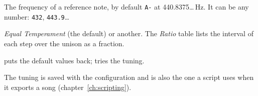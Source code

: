 
\begin{description}[style=nextline,leftmargin=1.2cm]
  \item[Base tuning (Hz) and Base note] The frequency of a reference note, by default \texttt{A-} at 440.8375\ldots\,Hz. It can be any
        number: \texttt{432}, \texttt{443.9}\ldots
  \item[Temperament] \emph{Equal Temperament} (the default) or another. The \emph{Ratio} table lists the interval of each step over the unison
        as a fraction.
  \item[Reset] puts the default values back;  tries the tuning.
\end{description}

The tuning is saved with the configuration and is also the one a script uses when it exports a song (chapter~\ref{ch:scripting}).
